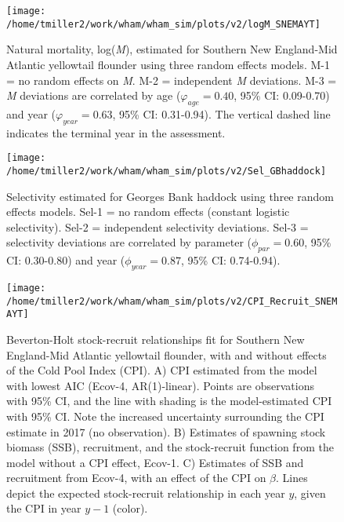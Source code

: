 \documentclass[]{article}
\begin{document}
\pagebreak

\begin{figure}

{\centering \texttt{[image: /home/tmiller2/work/wham/wham\_sim/plots/v2/logM\_SNEMAYT]} 

}

\caption{Natural mortality, log(\textit{M}), estimated for Southern New England-Mid Atlantic yellowtail flounder using three random effects models. M-1 = no random effects on \textit{M}. M-2 = independent \textit{M} deviations. M-3 = \textit{M} deviations are correlated by age ($\varphi_{age} = 0.40$, 95\% CI: 0.09-0.70) and year ($\varphi_{year} = 0.63$, 95\% CI: 0.31-0.94). The vertical dashed line indicates the terminal year in the assessment.}\label{fig:devs-snemayt-m}
\end{figure}

\pagebreak

\begin{figure}

{\centering \texttt{[image: /home/tmiller2/work/wham/wham\_sim/plots/v2/Sel\_GBhaddock]} 

}

\caption{Selectivity estimated for Georges Bank haddock using three random effects models. Sel-1 = no random effects (constant logistic selectivity). Sel-2 = independent selectivity deviations. Sel-3 = selectivity deviations are correlated by parameter ($\phi_{par} = 0.60$, 95\% CI: 0.30-0.80) and year ($\phi_{year} = 0.87$, 95\% CI: 0.74-0.94).}\label{fig:devs-GBhaddock-sel}
\end{figure}

\pagebreak

\begin{figure}

{\centering \texttt{[image: /home/tmiller2/work/wham/wham\_sim/plots/v2/CPI\_Recruit\_SNEMAYT]} 

}

\caption{Beverton-Holt stock-recruit relationships fit for Southern New England-Mid Atlantic yellowtail flounder, with and without effects of the Cold Pool Index (CPI). A) CPI estimated from the model with lowest AIC (Ecov-4, AR(1)-linear). Points are observations with 95\% CI, and the line with shading is the model-estimated CPI with 95\% CI. Note the increased uncertainty surrounding the CPI estimate in 2017 (no observation). B) Estimates of spawning stock biomass (SSB), recruitment, and the stock-recruit function from the model without a CPI effect, Ecov-1. C) Estimates of SSB and recruitment from Ecov-4, with an effect of the CPI on $\beta$. Lines depict the expected stock-recruit relationship in each year $y$, given the CPI in year $y-1$ (color).}\label{fig:devs-SNEMAYT-ecov}
\end{figure}
\end{document}

